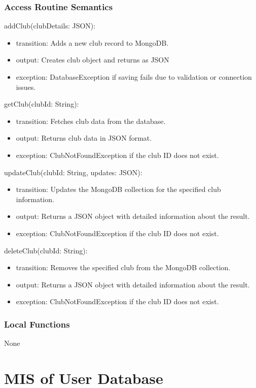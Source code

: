 \documentclass[12pt, titlepage]{article}
\begin{document}
\subsubsection{Access Routine Semantics}

\noindent addClub(clubDetails: JSON):
\begin{itemize}
  \item transition: Adds a new club record to MongoDB.
  \item output: Creates club object and returns as JSON
  \item exception: DatabaseException if saving fails due to validation or connection issues.
\end{itemize}

\noindent getClub(clubId: String):
\begin{itemize}
  \item transition: Fetches club data from the database.
  \item output: Returns club data in JSON format.
  \item exception: ClubNotFoundException if the club ID does not exist.
\end{itemize}

\noindent updateClub(clubId: String, updates: JSON):
\begin{itemize}
  \item transition: Updates the MongoDB collection for the specified club information.
  \item output: Returns a JSON object with detailed information about the result.
  \item exception: ClubNotFoundException if the club ID does not exist.
\end{itemize}

\noindent deleteClub(clubId: String):
\begin{itemize}
  \item transition: Removes the specified club from the MongoDB collection.
  \item output: Returns a JSON object with detailed information about the result.
  \item exception: ClubNotFoundException if the club ID does not exist.
\end{itemize}

\subsubsection{Local Functions}
None

\section{MIS of User Database} \label{User Database}
\end{document}
